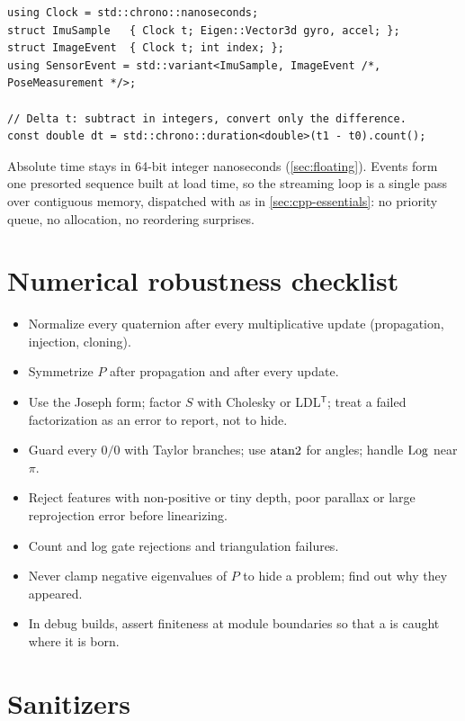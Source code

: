 \begin{lstlisting}
using Clock = std::chrono::nanoseconds;
struct ImuSample   { Clock t; Eigen::Vector3d gyro, accel; };
struct ImageEvent  { Clock t; int index; };
using SensorEvent = std::variant<ImuSample, ImageEvent /*, PoseMeasurement */>;

// Delta t: subtract in integers, convert only the difference.
const double dt = std::chrono::duration<double>(t1 - t0).count();
\end{lstlisting}

Absolute time stays in 64-bit integer nanoseconds (\cref{sec:floating}). Events form one presorted sequence built at load time, so the
streaming loop is a single pass over contiguous memory, dispatched with  as in \cref{sec:cpp-essentials}: no priority queue, no
allocation, no reordering surprises.

\section{Numerical robustness checklist}

\begin{itemize}
  \item Normalize every quaternion after every multiplicative update (propagation, injection, cloning).
  \item Symmetrize $P$ after propagation and after every update.
  \item Use the Joseph form; factor $S$ with Cholesky or LDL$^\mathsf{T}$; treat a failed factorization as an error to report, not to hide.
  \item Guard every $0/0$ with Taylor branches; use $\operatorname{atan2}$ for angles; handle $\operatorname{Log}$ near $\pi$.
  \item Reject features with non-positive or tiny depth, poor parallax or large reprojection error before linearizing.
  \item Count and log gate rejections and triangulation failures.
  \item Never clamp negative eigenvalues of $P$ to hide a problem; find out why they appeared.
  \item In debug builds, assert finiteness at module boundaries so that a  is caught where it is born.
\end{itemize}

\section{Sanitizers}
\label{sec:sanitizers}

